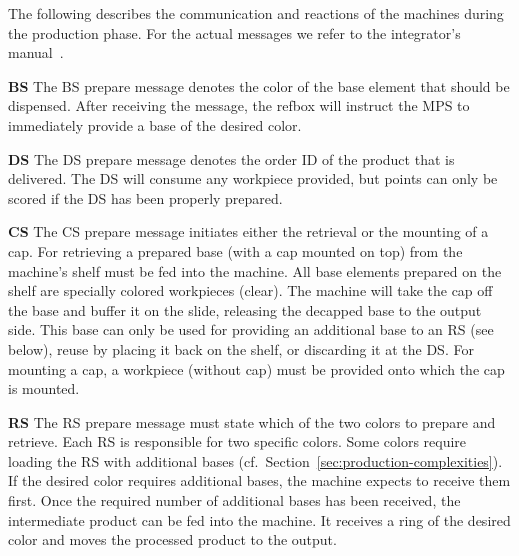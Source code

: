 \documentclass[12pt,twoside]{article}
\newcommand{\refsec}[1]{Section~\ref{#1}}
\begin{document}
The following describes the communication and reactions of the
machines during the production phase. For the actual messages we refer
to the integrator's manual~\cite{RefBoxIntManual}.

\smallskip

\noindent\textbf{BS}
The BS prepare message denotes the color of the base element that should
be dispensed. After receiving the message, the refbox will instruct
the MPS to immediately provide a base of the desired color.

\noindent\textbf{DS}
The DS prepare message denotes the order ID of the product that is delivered.
The DS will consume any workpiece provided, but points can only be scored if the
DS has been properly prepared.

\noindent\textbf{CS}
The CS prepare message initiates either the retrieval or the mounting of
a cap. For retrieving a prepared base (with a cap mounted on top) from
the machine's shelf must be fed into the machine. All base elements
prepared on the shelf are specially colored workpieces (clear). The
machine will take the cap off the base and buffer it on the slide,
releasing the decapped base to the output side. This base can only be
used for providing an additional base to an RS (see below), reuse by
placing it back on the shelf, or discarding it at the DS\@.  For
mounting a cap, a workpiece (without cap) must be provided onto which
the cap is mounted.

\noindent\textbf{RS}
The RS prepare message must state which of the two colors to prepare and
retrieve. Each RS is responsible for two specific colors. Some colors
require loading the RS with additional bases
(cf.~\refsec{sec:production-complexities}). If the desired color requires
additional bases, the machine expects to receive them first.
Once the required number of
additional bases has been received, the intermediate product can be
fed into the machine. It receives a ring of the desired color and
moves the processed product to the output.
\end{document}

